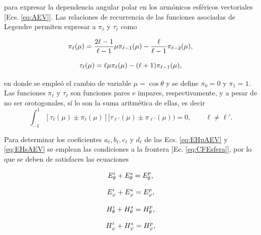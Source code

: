 \documentclass[letterpaper,11pt] {article}
\newcommand{\beqhalf}{\noindent \begin{minipage}[c]{.5\linewidth} \begin{equation}}
\newcommand{\eeqhalf}{\end{equation} \end{minipage} }
\newcommand{\eqhalf}[1]{\beqhalf #1 \eeqhalf}
\begin{document}
\noindent
para expresar la dependencia angular polar en los armónicos esféricos vectoriales [Ecs. \eqref{eq:AEV}]. Las relaciones de recurrencia de las funciones asociadas de Legendre \cite{arfken2001methods} permiten expresar a  $\pi_\ell$ y $\tau_\ell$ como  \cite{bohren1998absorption}

	\eqhalf{\pi_\ell(\mu) = \frac{2\ell-1}{\ell-1} \mu \pi_{\ell-1}(\mu) - \frac{\ell}{\ell-1}\pi_{\ell-2}(\mu),
		\notag}
	\eqhalf{\tau_\ell(\mu) = \ell \mu\pi_\ell(\mu) - (\ell+1)\pi_{\ell-1}(\mu),
		\notag}	

\noindent
en donde se empleó el cambio de variable $\mu = \cos\theta$ y se define   $\pi_0 =0 $ y $\pi_1 = 1$.  Las funciones $\pi_\ell$ y $\tau_\ell$ son funciones pares e impares, respectivamente, y a pesar de no ser orotogonales, sí lo son la suma aritmética de ellas, es decir
	\begin{equation}
	\int_{-1}^{1}[\tau_\ell(\mu)\pm\pi_\ell(\mu)]
	[\tau_{\ell'}(\mu)\pm\pi_{\ell'}(\mu)) = 0, \qquad \ell\neq \ell'. 
	\label{eq:ortTauPi}
	\end{equation}

Para determinar los coeficientes $a_\ell,b_\ell,c_\ell$ y $d_\ell$ de las Ecs. \eqref{eq:EHpAEV} y \eqref{eq:EHsAEV} se emplean las condiciones a la frontera [Ec. \eqref{eq:CFEsfera}], por lo que se deben de satisfaces las ecuaciones

	\eqhalf{E_\theta^i + E_\theta^s = E_\theta^p,\notag}
	\eqhalf{E_\varphi^i + E_\varphi^s = E_\varphi^p,\notag}
	\eqhalf{H_\theta^i + H_\theta^s = H_\theta^p,\notag}
	\eqhalf{H_\varphi^i + H_\varphi^s = H_\varphi^p,\notag}\vspace*{-1em}
\end{document}
